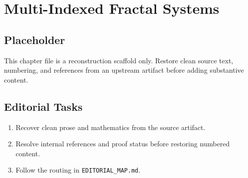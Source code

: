\chapter{Multi-Indexed Fractal Systems}
\label{chap:multi-indexed-fractal-systems}

\section*{Placeholder}
This chapter file is a reconstruction scaffold only. Restore clean source text, numbering, and references from an upstream artifact before adding substantive content.

\section*{Editorial Tasks}
\begin{enumerate}
\item Recover clean prose and mathematics from the source artifact.
\item Resolve internal references and proof status before restoring numbered content.
\item Follow the routing in \texttt{EDITORIAL\_MAP.md}.
\end{enumerate}
